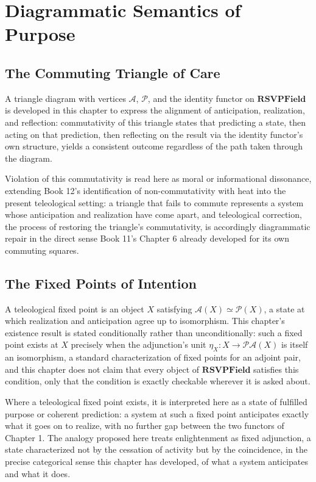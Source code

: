 \part{Diagrammatic Semantics of Purpose}

\chapter{The Commuting Triangle of Care}

A triangle diagram with vertices $\mathcal{A}$, $\mathcal{P}$, and the identity functor on $\mathbf{RSVPField}$ is developed in this chapter to express the alignment of anticipation, realization, and reflection: commutativity of this triangle states that predicting a state, then acting on that prediction, then reflecting on the result via the identity functor's own structure, yields a consistent outcome regardless of the path taken through the diagram.

Violation of this commutativity is read here as moral or informational dissonance, extending Book 12's identification of non-commutativity with heat into the present teleological setting: a triangle that fails to commute represents a system whose anticipation and realization have come apart, and teleological correction, the process of restoring the triangle's commutativity, is accordingly diagrammatic repair in the direct sense Book 11's Chapter 6 already developed for its own commuting squares.

\chapter{The Fixed Points of Intention}

A teleological fixed point is an object $X$ satisfying $\mathcal{A}(X) \simeq \mathcal{P}(X)$, a state at which realization and anticipation agree up to isomorphism. This chapter's existence result is stated conditionally rather than unconditionally: such a fixed point exists at $X$ precisely when the adjunction's unit $\eta_X: X \to \mathcal{P}\mathcal{A}(X)$ is itself an isomorphism, a standard characterization of fixed points for an adjoint pair, and this chapter does not claim that every object of $\mathbf{RSVPField}$ satisfies this condition, only that the condition is exactly checkable wherever it is asked about.

Where a teleological fixed point exists, it is interpreted here as a state of fulfilled purpose or coherent prediction: a system at such a fixed point anticipates exactly what it goes on to realize, with no further gap between the two functors of Chapter 1. The analogy proposed here treats enlightenment as fixed adjunction, a state characterized not by the cessation of activity but by the coincidence, in the precise categorical sense this chapter has developed, of what a system anticipates and what it does.

